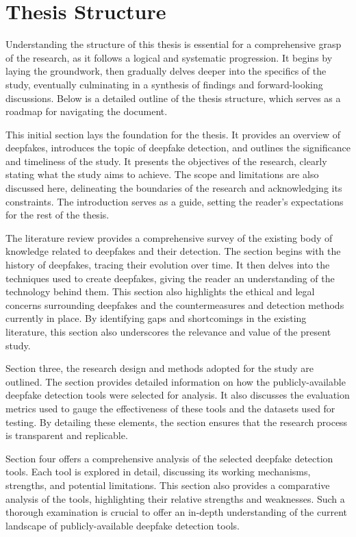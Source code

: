 \section{Thesis Structure}\label{chapter:structure}
Understanding the structure of this thesis is essential for a comprehensive grasp of the 
research, as it follows a logical and systematic progression. It begins by laying the 
groundwork, then gradually delves deeper into the specifics of the study, eventually 
culminating in a synthesis of findings and forward-looking discussions. Below is a 
detailed outline of the thesis structure, which serves as a roadmap for navigating 
the document.

This initial section lays the foundation for the thesis. It provides an overview of deepfakes, 
introduces the topic of deepfake detection, and outlines the significance and timeliness 
of the study. It presents the objectives of the research, clearly stating what the study 
aims to achieve. The scope and limitations are also discussed here, delineating the 
boundaries of the research and acknowledging its constraints. The introduction serves 
as a guide, setting the reader's expectations for the rest of the thesis.

The literature review provides a comprehensive survey of the existing body of knowledge 
related to deepfakes and their detection. The section begins with the history of 
deepfakes, tracing their evolution over time. It then delves into the techniques used 
to create deepfakes, giving the reader an understanding of the technology behind them. 
This section also highlights the ethical and legal concerns surrounding deepfakes and 
the countermeasures and detection methods currently in place. By identifying gaps and 
shortcomings in the existing literature, this section also underscores the relevance 
and value of the present study.

Section three, the research design and methods adopted for the study are outlined. 
The section provides detailed information on how the publicly-available deepfake 
detection tools were selected for analysis. It also discusses the evaluation metrics 
used to gauge the effectiveness of these tools and the datasets used for testing. 
By detailing these elements, the section ensures that the research process is 
transparent and replicable.

Section four offers a comprehensive analysis of the selected deepfake detection tools. 
Each tool is explored in detail, discussing its working mechanisms, strengths, and 
potential limitations. This section also provides a comparative analysis of the tools, 
highlighting their relative strengths and weaknesses. Such a thorough examination is 
crucial to offer an in-depth understanding of the current landscape of publicly-available 
deepfake detection tools.

